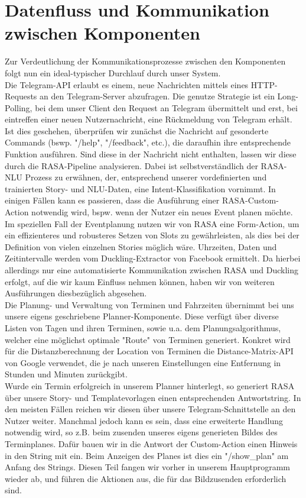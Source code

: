 \section{Datenfluss und Kommunikation zwischen Komponenten}
Zur Verdeutlichung der Kommunikationsprozesse zwischen den Komponenten folgt nun ein ideal-typischer Durchlauf durch unser System.\\

Die Telegram-API erlaubt es einem, neue Nachrichten mittels eines HTTP-Requests an den Telegram-Server abzufragen. Die genutze Strategie ist ein Long-Polling, bei dem unser Client den Request an Telegram übermittelt und erst, bei eintreffen einer neuen Nutzernachricht, eine Rückmeldung von Telegram erhält. Ist dies geschehen, überprüfen wir zunächst die Nachricht auf gesonderte Commands (bswp. "/help", "/feedback", etc.), die daraufhin ihre entsprechende Funktion ausführen. Sind diese in der Nachricht nicht enthalten, lassen wir diese durch die RASA-Pipeline analysieren. Dabei ist selbstverständlich der RASA-NLU Prozess zu erwähnen, der, entsprechend unserer vordefinierten und trainierten Story- und NLU-Daten, eine Intent-Klassifikation vornimmt. In einigen Fällen kann es passieren, dass die Ausführung einer RASA-Custom-Action notwendig wird, bspw. wenn der Nutzer ein neues Event planen möchte. Im speziellen Fall der Eventplanung nutzen wir von RASA eine Form-Action, um ein effizienteres und robusteres Setzen von Slots zu gewährleisten, als dies bei der Definition von vielen einzelnen Stories möglich wäre. Uhrzeiten, Daten und Zeitintervalle werden vom Duckling-Extractor von Facebook ermittelt. Da hierbei allerdings nur eine automatisierte Kommunikation zwischen RASA und Duckling erfolgt, auf die wir kaum Einfluss nehmen können, haben wir von weiteren Ausführungen diesbezüglich abgesehen.\\

Die Planung- und Verwaltung von Terminen und Fahrzeiten übernimmt bei uns unsere eigens geschriebene Planner-Komponente. Diese verfügt über diverse Listen von Tagen und ihren Terminen, sowie u.a. dem Planungsalgorithmus, welcher eine möglichst optimale "Route" von Terminen generiert.
Konkret wird für die Distanzberechnung der Location von Terminen die Distance-Matrix-API von Google verwendet, die je nach unseren Einstellungen eine Entfernung in Stunden und Minuten zurückgibt.\\

Wurde ein Termin erfolgreich in unserem Planner hinterlegt, so generiert RASA über unsere Story- und Templatevorlagen einen entsprechenden Antwortstring. In den meisten Fällen reichen wir diesen über unsere Telegram-Schnittstelle an den Nutzer weiter. Manchmal jedoch kann es sein, dass eine erweiterte Handlung notwendig wird, so z.B. beim zusenden unseres eigens generieten Bildes des Terminplanes. Dafür bauen wir in die Antwort der Custom-Action einen Hinweis in den String mit ein. Beim Anzeigen des Planes ist dies ein "/show\_plan" am Anfang des Strings. Diesen Teil fangen wir vorher in unserem Hauptprogramm wieder ab, und führen die Aktionen aus, die für das Bildzusenden erforderlich sind.

